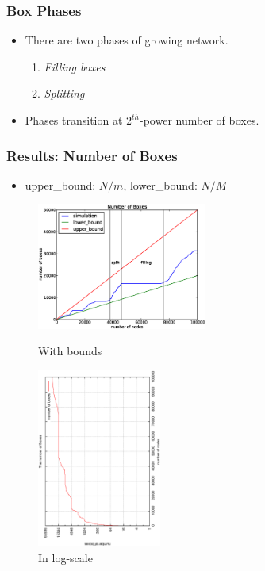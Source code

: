 \documentclass[red]{beamer}
\begin{document}
\begin{frame}
\frametitle{Box Phases}
\begin{itemize}
\item There are two phases of growing network.
\begin{enumerate}
\item \textit{Filling boxes}
\item \textit{Splitting}
\end{enumerate}
\item Phases transition at $2^{th}$-power number of boxes.
\end{itemize}
\end{frame}



\begin{frame}
\frametitle{Results: Number of Boxes}
\begin{itemize}
\item upper\_bound: $N/m$, lower\_bound: $N/M$
\end{itemize}
\begin{figure}
\begin{minipage}{5cm}
\centering
\includegraphics[width=2.2in]{figs/no_box_100k.eps}
\caption{With bounds} 
\end{minipage}
\begin{minipage}{5cm}
\centering
\includegraphics[width=1.6in,angle=270]{figs/box_count_logy.eps}
\caption{In log-scale}
\end{minipage}
\end{figure}
\end{frame}
\end{document}
